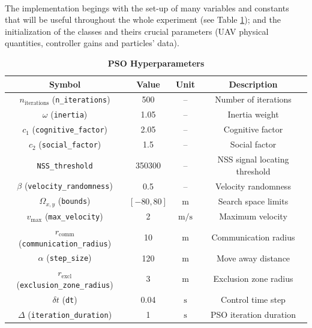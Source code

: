 \noindent\\
The implementation begings with the set-up of 
many variables and constants that will be useful throughout 
the whole experiment (see Table \ref{tab:pso_parameters}); and the initialization of the classes and theirs
crucial parameters (UAV physical quantities, controller gains and 
particles' data).
\begin{table}
\centering
\caption{\textbf{PSO Hyperparameters}}
\begin{tabular}{c c c c}
\hline\hline
\textbf{Symbol}              & \textbf{Value}        & \textbf{Unit}           & \textbf{Description}      \\ \hline\hline                   
\(n_{\text{iterations}}\) (\texttt{n\_iterations})      & 500                   & --                      & Number of iterations      \\
\(\omega\) (\texttt{inertia})                          & 1.05                  & --                      & Inertia weight            \\
\(c_1\) (\texttt{cognitive\_factor})                   & 2.05                  & --                      & Cognitive factor          \\
\(c_2\) (\texttt{social\_factor})                      & 1.5                   & --                      & Social factor             \\
 \texttt{NSS\_threshold}                               & 350300                & --                      & NSS signal locating threshold\\
\(\beta\) (\texttt{velocity\_randomness})              & 0.5                   & --                      & Velocity randomness       \\ \hline
\(\Omega_{x,y}\) (\texttt{bounds})                     & \([-80, 80]\)         & \(\text{m}\)            & Search space limits       \\
\(v_{\text{max}}\) (\texttt{max\_velocity})            & 2                     & \(\text{m/s}\)          & Maximum velocity          \\                
\(r_{\text{comm}}\) (\texttt{communication\_radius})   & 10                    & \(\text{m}\)           & Communication radius      \\
\(\alpha\) (\texttt{step\_size})                       & 120                    & \(\text{m}\)           & Move away distance        \\
\(r_{\text{excl}}\) (\texttt{exclusion\_zone\_radius}) & 3                     & \(\text{m}\)           & Exclusion zone radius     \\
\(\delta t\) (\texttt{dt})                             & 0.04                  & \(\text{s}\)           & Control time step         \\
\(\Delta\) (\texttt{iteration\_duration})              & 1                     & \(\text{s}\)           & PSO iteration duration    \\
\hline\hline
\end{tabular}
\label{tab:pso_parameters}
\end{table}
    
